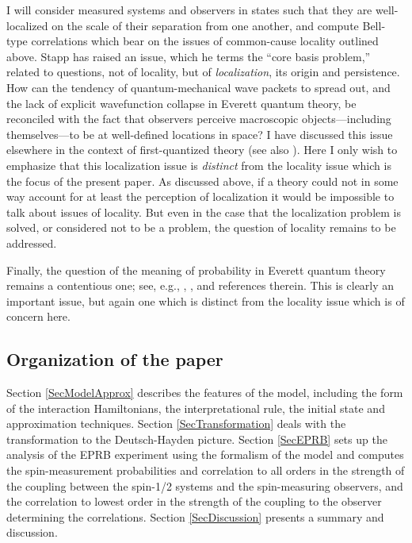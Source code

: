 \documentclass[12pt]{article}
\begin{document}
I will consider measured systems and observers in states such that they are well-localized on
the scale of their separation 
from one another, and compute Bell-type correlations which bear on the issues
of common-cause locality outlined above. Stapp \cite{Stapp02} has raised an issue,
which he terms the ``core basis problem,'' related to questions, not of locality, but of {\em localization}\/,
its origin and persistence. 
How can the tendency of quantum-mechanical wave packets to spread out, and the lack of explicit wavefunction collapse
in Everett quantum theory, be reconciled with the
fact that observers perceive macroscopic objects---including themselves---to be at well-defined
locations in space?  I have discussed this issue elsewhere \cite{Rubin06} in the context of first-quantized theory
(see also \cite{Zurek04}). Here I only wish to emphasize that this localization issue is {\em distinct}\/ from the 
locality issue which is the focus of the present paper.  As discussed above, if a theory could not
in some way account for at least the perception of localization it would be impossible to talk about issues
of locality. But even in the case that the localization problem is solved, or considered not to  be a problem, the 
question of locality remains to be addressed.

Finally, the question  of the meaning of probability in Everett quantum theory remains  a contentious one; 
see, e.g., \cite{HewittHorsman09}, \cite{Schlosshauer08}, \cite{Wallace07} and references therein.
This is clearly an important issue, but again one which is distinct from  the locality issue which is of concern here.
 


\subsection{Organization of the paper}\label{SecOrg}

Section \ref{SecModelApprox} 
describes the features of the model, including
the form of the interaction Hamiltonians, the interpretational rule, the initial state and  approximation techniques.
Section \ref{SecTransformation} 
deals with the transformation to the Deutsch-Hayden picture.   
Section \ref{SecEPRB}     
sets up the analysis of the EPRB experiment
using the formalism of the model and computes the spin-measurement  probabilities and correlation to all orders in the
strength of the coupling between the  spin-1/2 systems and the spin-measuring observers, and the correlation to lowest order in the
strength of the coupling to the observer determining the correlations.
Section \ref{SecDiscussion}    
presents a summary and discussion. 
\end{document}
